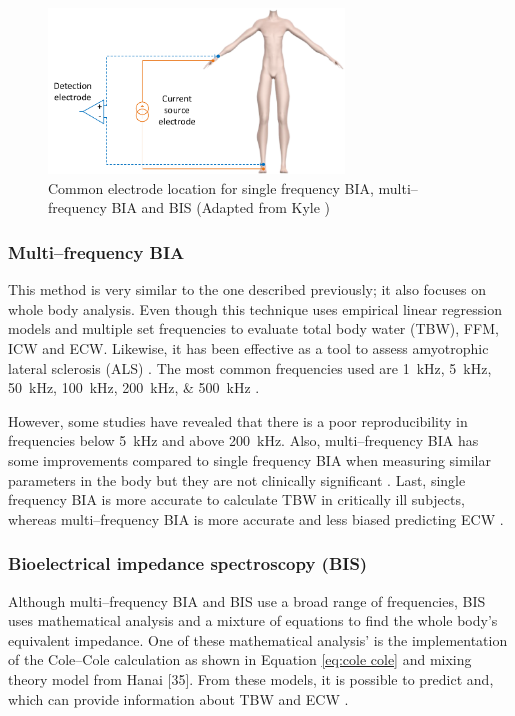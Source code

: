 \begin{figure}[!htpb]
	\centering
	\includegraphics[width=0.7\textwidth,keepaspectratio]{figure12}    
	\caption[Common electrodes placement for whole body BIA and BIS]{Common electrode location for single frequency BIA, multi–frequency BIA and BIS (Adapted from Kyle \cite{kyle2004bioelectrical})}
	\label{fig:single f BIA}
\end{figure}

\subsubsection{Multi–frequency BIA}
This method is very similar to the one described previously; it also focuses on whole body analysis. Even though this technique uses empirical linear regression models and multiple set frequencies to evaluate total body water (TBW), FFM, ICW and ECW. Likewise, it has been effective as a tool to assess amyotrophic lateral sclerosis (ALS) \cite{wang2011electrical}. The most common frequencies used are \SIlist{1;5;50;100;200;500}{\kilo\hertz} \cite{kyle2004bioelectrical}. 

However, some studies have revealed that there is a poor reproducibility in frequencies below \SI{5}{\kilo\hertz} and above \SI{200}{\kilo\hertz}. Also, multi–frequency BIA has some improvements compared to single frequency BIA when measuring similar parameters in the body but they are not clinically significant \cite{hannan1995comparison}. Last, single frequency BIA is more accurate to calculate TBW in critically ill subjects, whereas multi–frequency BIA is more accurate and less biased predicting ECW \cite{patel1996estimation}. 

\subsubsection{Bioelectrical impedance spectroscopy (BIS)}
Although multi–frequency BIA and BIS use a broad range of frequencies, BIS uses mathematical analysis and a mixture of equations to find the whole body’s equivalent impedance. One of these mathematical analysis’ is the implementation of the Cole–Cole \cite{cole1941dispersion} calculation as shown in Equation \ref{eq:cole cole} and mixing theory model from Hanai [35]. From these models, it is possible to predict and, which can provide information about TBW and ECW \cite{hanai1968electrical}. 

